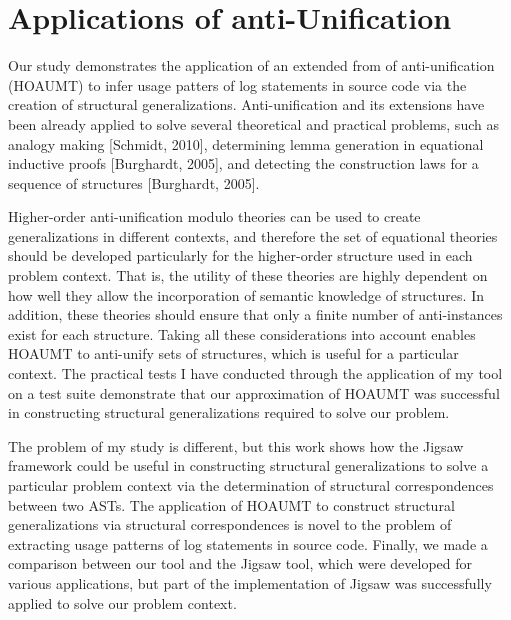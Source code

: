 \section{Applications of anti-Unification}  \label{auTheory}
Our study demonstrates the application of an extended from of anti-unification (HOAUMT) to infer usage patters of log statements in source code via the creation of structural generalizations. Anti-unification and its extensions have been already applied to solve several theoretical and practical problems, such as analogy making [Schmidt, 2010], determining lemma generation in equational inductive proofs [Burghardt, 2005], and detecting the construction laws for a sequence of structures [Burghardt, 2005]. 

Higher-order anti-unification modulo theories can be used to create generalizations in different contexts, and therefore the set of equational theories should be developed particularly for the higher-order structure used in each problem context. That is, the utility of these theories are highly dependent on how well they allow the incorporation of semantic knowledge of structures. In addition, these theories should ensure that only a finite number of anti-instances exist for each structure. Taking all these considerations into account enables HOAUMT to anti-unify sets of structures, which is useful for a particular context. The practical tests I have conducted through the application of my tool on a test suite demonstrate that our approximation of HOAUMT was successful in constructing structural generalizations required to solve our problem.
%

The problem of my study is different, but this work shows how the Jigsaw framework could be useful in constructing structural generalizations to solve a particular problem context via the determination of structural correspondences between two ASTs. The application of HOAUMT to construct structural generalizations via structural correspondences is novel to the problem of extracting usage patterns of log statements in source code.
Finally, we made a comparison between our tool and the Jigsaw tool, which were developed for various applications, but part of the implementation of Jigsaw was successfully applied to solve our problem context.



